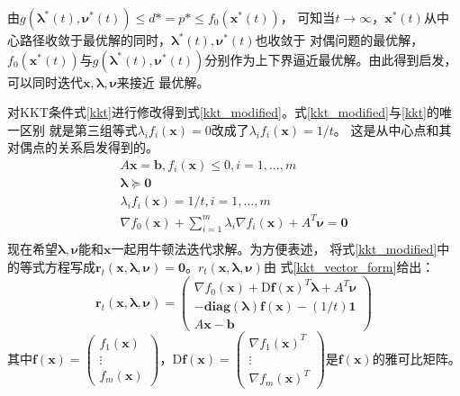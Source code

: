 \documentclass{article}
\begin{document}
由$g(\bm\lambda^*(t),\bm\nu^*(t))\le d*=p*\le f_0(\bm x^*(t))$，
可知当$t\rightarrow\infty$，$\bm x^*(t)$从中心路径收敛于最优解的同时，$\bm\lambda^*(t),\bm\nu^*(t)$也收敛于
对偶问题的最优解，$f_0(\bm x^*(t))$与$g(\bm\lambda^*(t),\bm\nu^*(t))$分别作为上下界逼近最优解。由此得到启发，可以同时迭代$\bm x,\bm\lambda,\bm\nu$来接近
最优解。

对KKT条件式\eqref{kkt}进行修改得到式\eqref{kkt_modified}。式\eqref{kkt_modified}与\eqref{kkt}的唯一区别
就是第三组等式$\lambda_if_i(\bm x)=0$改成了$\lambda_if_i(\bm x)=1/t$。
这是从中心点和其对偶点的关系启发得到的。
\begin{equation}
    \label{kkt_modified}
    \begin{gathered}
    A\bm x=\bm b,f_i(\bm x)\le 0,i=1,...,m \\
    \bm\lambda\succeq \bm 0 \\
    \lambda_if_i(\bm x)=1/t,i=1,...,m\\
    \nabla f_0(\bm x)+\sum_{i=1}^m{\lambda_i}\nabla f_i(\bm x)+A^T\bm\nu=\bm 0\\
    \end{gathered}
\end{equation}
现在希望$\bm\lambda,\bm\nu$能和$\bm x$一起用牛顿法迭代求解。为方便表述，
将式\eqref{kkt_modified}中的等式方程写成$\bm r_t(\bm x,\bm\lambda,\bm\nu)=\bm 0$。$r_t(\bm x,\bm\lambda,\bm\nu)$由
式\eqref{kkt_vector_form}给出：
\begin{equation}
\label{kkt_vector_form}
\bm r_t(\bm x,\bm\lambda,\bm\nu)=\begin{pmatrix}
    \nabla f_0(\bm x)+\text{D}\textbf{f}(\bm x)^T\bm\lambda+A^T\bm\nu \\
    -\textbf{diag}(\bm\lambda)\textbf{f}(\bm x)-(1/t)\bm 1 \\
    A\bm x-\bm b
\end{pmatrix}
\end{equation}
其中$\textbf{f}(\bm x)=\begin{pmatrix}
    f_1(\bm x) \\
    \vdots \\
    f_m(\bm x)
\end{pmatrix}$，$\text{D}\textbf{f}(\bm x)=\begin{pmatrix}
    \nabla f_1(\bm x)^T \\
    \vdots \\
    \nabla f_m(\bm x)^T
\end{pmatrix}$是$\textbf{f}(\bm x)$的雅可比矩阵。
\end{document}
